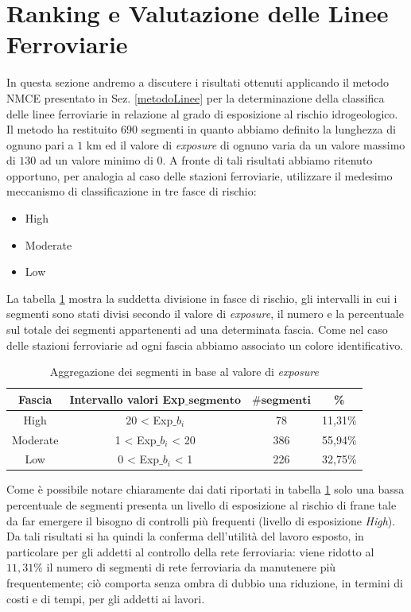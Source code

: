 \section{Ranking e Valutazione delle Linee Ferroviarie}
In questa sezione andremo a discutere i risultati ottenuti applicando il metodo NMCE presentato in Sez. \ref{metodoLinee} per la determinazione della classifica delle linee ferroviarie in relazione al grado di esposizione al rischio idrogeologico.\newline \newline
Il metodo ha restituito $690$ segmenti in quanto abbiamo definito la lunghezza di ognuno pari a $1$ km ed il valore di \textit{exposure} di ognuno varia da un valore massimo di $130$ ad un valore minimo di $0$. A fronte di tali risultati abbiamo ritenuto opportuno, per analogia al caso delle stazioni ferroviarie, utilizzare il medesimo meccanismo di classificazione in tre fasce di rischio:
\begin{itemize}
	\item High
	\item Moderate
	\item Low
\end{itemize}
La tabella \ref{rangeLinee} mostra la suddetta divisione in fasce di rischio, gli intervalli in cui i segmenti sono stati divisi secondo il valore di \textit{exposure}, il numero e la percentuale sul totale dei segmenti appartenenti ad una determinata fascia. Come nel caso delle stazioni ferroviarie ad ogni fascia abbiamo associato un colore identificativo.
\begin{table}[h]
\centering
\begin{tabular}{|c|c|c|c|}
\hline
\rowcolor{lightgray}
\textbf{Fascia} & \textbf{Intervallo valori Exp$\mathbf{\_}$$\mathbf{segmento}$} & $\mathbf{\#segmenti}$ & \textbf{\%} \\
\hline
\rowcolor{flamingopink}
High & 20 < Exp$\_$$b_i$  & 78 & 11,31\%\\
\hline
\rowcolor{icterine}
Moderate & 1 < Exp$\_$$b_i$ < 20 & 386 & 55,94\%\\
\hline
\rowcolor{inchworm}
Low & $0$ < Exp$\_$$b_i$ < 1 & 226 & 32,75\%\\
\hline
\end{tabular}
\caption{Aggregazione dei segmenti in base al valore di \textit{exposure} }
\label{rangeLinee}
\end{table}
\newline
Come è possibile notare chiaramente dai dati riportati in tabella \ref{rangeLinee} solo una bassa percentuale de segmenti presenta un livello di esposizione al rischio di frane tale da far emergere il bisogno di controlli più frequenti (livello di esposizione \textit{High}). Da tali risultati si ha quindi la conferma dell'utilità del lavoro esposto, in particolare per gli addetti al controllo della rete ferroviaria: viene ridotto al $11,31\%$ il numero di segmenti di rete ferroviaria da manutenere più frequentemente; ciò comporta senza ombra di dubbio una riduzione, in termini di costi e di tempi, per gli addetti ai lavori.\newline
